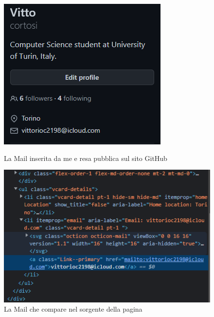 \begin{figure}
  \centering
  \begin{minipage}[b]{0.4\textwidth}
    \includegraphics[width=\textwidth]{pictures/git1.png}
    \caption{La Mail inserita da me e resa pubblica sul sito GitHub}
    \label{fig:git}
  \end{minipage}
  \begin{minipage}[b]{0.56\textwidth}
    \includegraphics[width=\textwidth]{pictures/git2.png}
    \caption{La Mail che compare nel sorgente della pagina}
    \label{fig:git2}
  \end{minipage}
\end{figure}\\

